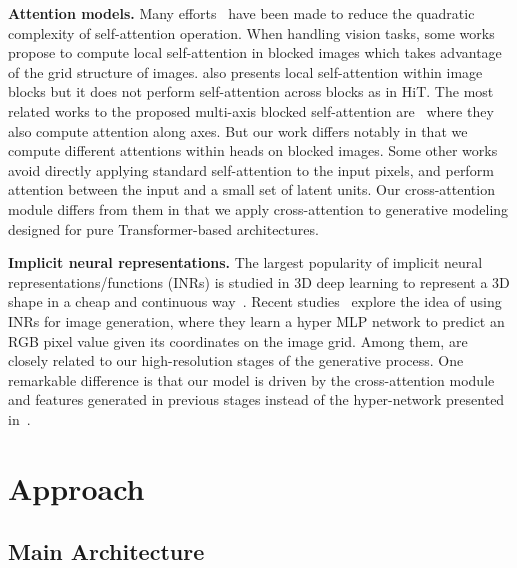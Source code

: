 \documentclass{article}
\newcommand{\p}[1]{\textbf{#1.}}
\begin{document}
\p{Attention models} Many efforts~\cite{beltagy2020longformer,ho2019axial,wang2020axial} have been made to reduce the quadratic complexity of self-attention operation. When handling vision tasks, some works~\cite{liu2021swin,vaswani2021scaling,zhang2021aggregating} propose to compute local self-attention in blocked images which takes advantage of the grid structure of images. \cite{cao2021video} also presents local self-attention within image blocks but it does not perform self-attention across blocks as in HiT. The most related works to the proposed multi-axis blocked self-attention are~\cite{ho2019axial,wang2020axial} where they also compute attention along axes. But our work differs notably in that we compute different attentions within heads on blocked images. Some other works~\cite{chen2021crossvit,hudson2021generative,jaegle2021perceiver} avoid directly applying standard self-attention to the input pixels, and perform attention between the input and a small set of latent units. Our cross-attention module differs from them in that we apply cross-attention to generative modeling designed for pure Transformer-based architectures.  

\p{Implicit neural representations} The largest popularity of implicit neural representations/functions (INRs) is studied in 3D deep learning to represent a 3D shape in a cheap and continuous way~\cite{mescheder2019occupancy,mildenhall2020nerf,park2019deepsdf}. Recent studies~\cite{anokhin2021image,dupont2021generative,lin2021infinitygan,skorokhodov2021adversarial} explore the idea of using INRs for image generation, where they learn a hyper MLP network to predict an RGB pixel value given its coordinates on the image grid. Among them, \cite{anokhin2021image,skorokhodov2021adversarial} are closely related to our high-resolution stages of the generative process. One remarkable difference is that our model is driven by the cross-attention module and features generated in previous stages instead of the hyper-network presented in~\cite{anokhin2021image,skorokhodov2021adversarial}. \section{Approach}





\subsection{Main Architecture}
\end{document}
